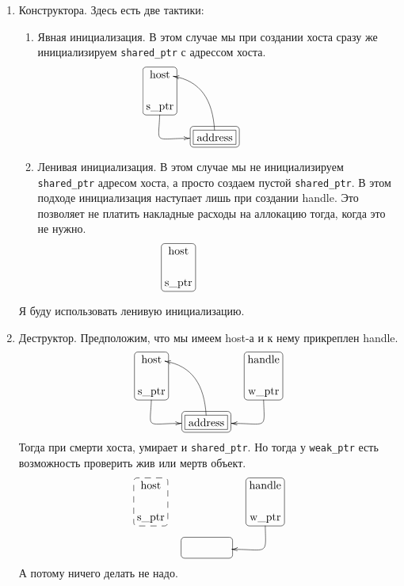 \begin{enumerate}
\item Конструктора.
Здесь есть две тактики:
\begin{enumerate}
\item Явная инициализация.
В этом случае мы при создании хоста сразу же инициализируем \verb"shared_ptr" с адрессом хоста.
\[
\xymatrix@R=15pt@C=15pt{
  {\text{host}}
  	{
	\save
   [].[d]*[F-:<3pt>]\frm{}
   \restore
	}
  &{}&{\phantom{handle}}
  \\ 
  {\text{s\_ptr}}\ar@(d,l)[dr]+(-8,0)
  &{}&{\phantom{s\_ptr}}\\
  {}&{\text{address}}\ar@(u,r)[uul]
      	{
	\save
   [].[]*[F-]\frm{}
   \restore
	}
    	{
	\save
   [].[]*+[F-:<3pt>]\frm{}
   \restore
	}
  &{}\\
}
\]
\item Ленивая инициализация.
В этом случае мы не инициализируем \verb"shared_ptr" адресом хоста, а просто создаем пустой \verb"shared_ptr".
В этом подходе инициализация наступает лишь при создании handle.
Это позволяет не платить накладные расходы на аллокацию тогда, когда это не нужно.
\[
\xymatrix@R=15pt@C=15pt{
  {\text{host}}
  	{
	\save
   [].[d]*[F-:<3pt>]\frm{}
   \restore
	}
  &{}&{\phantom{handle}}
  \\ 
  {\text{s\_ptr}}%
  &{}&{\phantom{s\_ptr}}\\
}
\]
\end{enumerate}
Я буду использовать ленивую инициализацию.

\item Деструктор.
Предположим, что мы имеем host-а и к нему прикреплен  handle.
\[
\xymatrix@R=15pt@C=15pt{
  {\text{host}}
  	{
	\save
   [].[d]*[F-:<3pt>]\frm{}
   \restore
	}
  &{}&{\text{handle}}
    	{
	\save
   [].[d]*[F-:<3pt>]\frm{}
   \restore
	}
  \\ 
  {\text{s\_ptr}}\ar@(d,l)[dr]+(-8,0)&{}&{\text{w\_ptr}}\ar@(d,r)[dl]+(8,0)\\
  {}&{\text{address}}\ar@(u,r)[uul]
      	{
	\save
   [].[]*[F-]\frm{}
   \restore
	}
    	{
	\save
   [].[]*+[F-:<3pt>]\frm{}
   \restore
	}
  &{}\\
}
\]
Тогда при смерти хоста, умирает и \verb"shared_ptr".
Но тогда у \verb"weak_ptr" есть возможность проверить жив или мертв объект.
\[
\xymatrix@R=15pt@C=15pt{
  {\text{host}}
  	{
	\save
   [].[d]*[F--:<3pt>]\frm{}
   \restore
	}
  &{}&{\text{handle}}
    	{
	\save
   [].[d]*[F-:<3pt>]\frm{}
   \restore
	}
  \\ 
  {\text{s\_ptr}}&{}&{\text{w\_ptr}}\ar@(d,r)[dl]+(8,0)\\
  {}&{\phantom{address}}
      	{
	\save
   [].[]*\frm{}
   \restore
	}
    	{
	\save
   [].[]*+[F-:<3pt>]\frm{}
   \restore
	}
  &{}\\
}
\]
А потому ничего делать не надо.


\end{enumerate}
